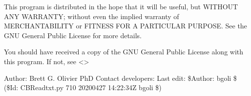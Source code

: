 \documentclass[letterpaper,10pt,english]{sphinxmanual}
\begin{document}
\sphinxAtStartPar
This program is distributed in the hope that it will be useful,
but WITHOUT ANY WARRANTY; without even the implied warranty of
MERCHANTABILITY or FITNESS FOR A PARTICULAR PURPOSE.  See the
GNU General Public License for more details.

\sphinxAtStartPar
You should have received a copy of the GNU General Public License
along with this program.  If not, see \textless{}\textgreater{}

\sphinxAtStartPar
Author: Brett G. Olivier PhD
Contact developers: 
Last edit: \$Author: bgoli \$ (\$Id: CBReadtxt.py 710 2020\sphinxhyphen{}04\sphinxhyphen{}27 14:22:34Z bgoli \$)
\end{document}

